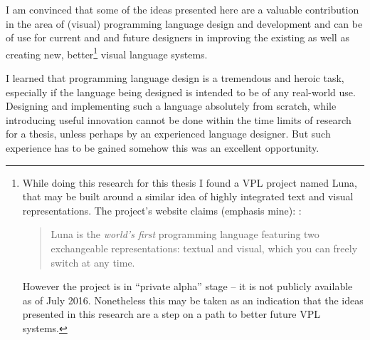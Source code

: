 \clearpage
I am convinced that some of the ideas presented here are a valuable contribution in the area of (visual) programming language design and development and can be of use for current and and future designers in improving the existing as well as creating new, better\footnote{
While doing this research for this thesis I found a VPL project named Luna, that may be built around a similar idea of highly integrated text and visual representations. The project's website claims (emphasis mine):
\cite{luna_website}:
\begin{quote}
Luna is the \textit{world’s first} programming language featuring two exchangeable representations: textual and visual, which you can freely switch at any time.
\end{quote}

However the project is in ``private alpha'' stage -- it is not publicly available as of July 2016. Nonetheless this may be taken as an indication that the ideas presented in this research are a step on a path to better future VPL systems.
} visual language systems.

I learned that programming language design is a tremendous and heroic task, especially if the language being designed is intended to be of any real-world use. Designing and implementing such a language absolutely from scratch, while introducing useful innovation cannot be done within the time limits of research for a thesis, unless perhaps by an experienced language designer. But such experience has to be gained somehow this was an excellent opportunity.
